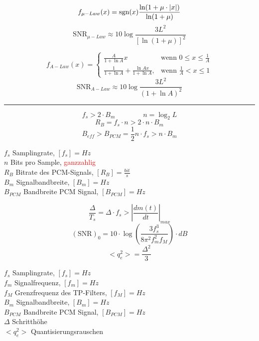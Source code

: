 \begin{minipage}{9cm}
$$ f_{\mu-Law}(x) = \operatorname{sgn}(x) \frac{\ln(1+\mu\cdot|x|)}{\ln(1+\mu)}$$
$$\text{SNR}_{\mu-Law} \approx 10 \log \dfrac{3 L^2}{[\ln(1 + \mu)]^2}$$
\end{minipage}
\begin{minipage}{9cm}
$$f_{A-Law}(x)=\begin{cases} \frac{A}{1+ \ln A} x & \mbox{wenn }0 \le x \le \frac{1}{A} \\
	\frac{1}{1+ \ln A} + \frac{\ln Ax}{1+ \ln A}, & \mbox{wenn } \frac{1}{A} < x \le 1 \end{cases} $$
$$\text{SNR}_{A-Law} \approx 10 \log \dfrac{3 L^2}{(1+\ln A)^2}$$
\end{minipage}
\hrule


\begin{minipage}{9cm}
	$$ f_s > 2 \cdot B_m  \qquad \qquad n = \log_2 L$$ 
	$$ R_B = f_s \cdot n > 2 \cdot n \cdot B_m $$ 
	$$ B_{eff} > B_{PCM} = \frac{1}{2} n \cdot f_s > n \cdot B_m$$
\end{minipage}
\begin{minipage}{9cm}
	$f_s$ Samplingrate, $[f_s] = Hz$ \\
	$n$ Bits pro Sample, \textcolor{red}{ganzzahlig} \\
	$R_B$ Bitrate des PCM-Signals, $[R_B] = \frac{bit}{s}$ \\
	$B_m$ Signalbandbreite, $[B_m] = Hz $ \\
	$B_{PCM}$ Bandbreite PCM Signal, $[B_{PCM}] = Hz $
\end{minipage}


\begin{minipage}{9cm}
$$ \frac{\Delta}{T_s} = \Delta \cdot f_s > \left| \frac{d m(t)}{dt} \right|_{max}$$
$$ (\text{SNR})_0 = 10 \cdot \log\left(\frac{3 f_s^3}{8 \pi^2 f_m^2 f_M}\right) \cdot dB$$ 
$$ <q_e^2> = \frac{\Delta^2}{3} $$ 
\end{minipage}
\begin{minipage}{9cm}
	$f_s$ Samplingrate, $[f_s] = Hz$ \\
	$f_m$ Signalfrequenz, $[f_m] = Hz$ \\
	$f_M$ Grenzfrequenz des TP-Filters, $[f_M] = Hz$ \\
	$B_m$ Signalbandbreite, $[B_m] = Hz $ \\
	$B_{PCM}$ Bandbreite PCM Signal, $[B_{PCM}] = Hz $\\
	$\Delta$ Schritthöhe\\
	$<q_e^2>$ Quantisierungsrauschen \\
	
\end{minipage}

